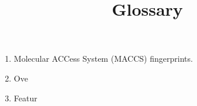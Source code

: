 \documentclass[12pt]{osa-supplemental-document}
\title{Glossary}
\begin{document}
\begin{enumerate}


    \item  Molecular ACCess System (MACCS) fingerprints.
    \item Ove
    \item Featur
    
    
    
    
    
    
    
\end{enumerate}
\end{document}
